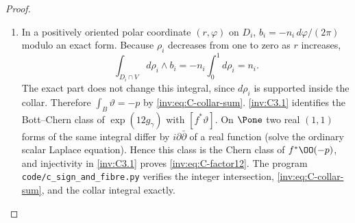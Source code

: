 \begin{proof}
\begin{enumerate}[label=\arabic*.,leftmargin=*]
\item In a positively oriented polar coordinate $(r,\varphi)$ on $D_i$,
$b_i=-n_i\,d\varphi/(2\pi)$ modulo an exact form.
Because $\rho_i$ decreases from one to zero as $r$ increases,
\[
\int_{D_i\cap V}d\rho_i\wedge b_i
=-n_i\int_0^1d\rho_i=n_i.
\]
The exact part does not change this integral, since $d\rho_i$ is
supported inside the collar.  Therefore
$\int_B\vartheta=-p$ by \eqref{inv:eq:C-collar-sum}.  \ref{inv:C3.1} identifies
the Bott--Chern class of $\exp(12g_\gamma)$ with $[f^*\vartheta]$.
On $\Pone$ two real $(1,1)$ forms of the same integral differ by
$i\partial\bar\partial$ of a real function (solve the ordinary
scalar Laplace equation).  Hence this class is the Chern class of
$f^*\OO(-p)$, and injectivity in \ref{inv:C3.1} proves
\eqref{inv:eq:C-factor12}.  The program
\texttt{code/c\_sign\_and\_fibre.py} verifies the integer
intersection, \eqref{inv:eq:C-collar-sum}, and the collar integral exactly.
\end{enumerate}
\end{proof}

